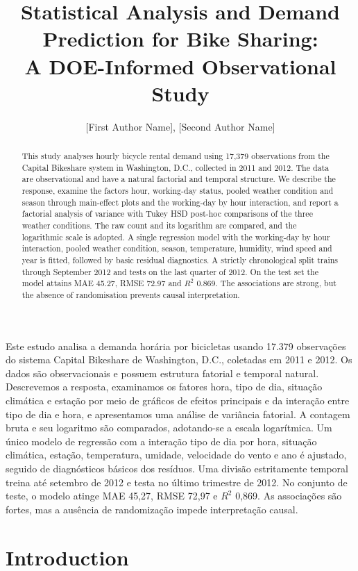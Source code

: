 \documentclass[12pt]{article}
\title{Statistical Analysis and Demand Prediction for Bike Sharing:\\
A DOE-Informed Observational Study}
\author{[First Author Name]\inst{1}, [Second Author Name]\inst{1}}
\begin{document}
\maketitle

\begin{abstract}
This study analyses hourly bicycle rental demand using 17,379 observations from
the Capital Bikeshare system in Washington, D.C., collected in 2011 and 2012.
The data are observational and have a natural factorial and temporal structure.
We describe the response, examine the factors hour, working-day status, pooled
weather condition and season through main-effect plots and the working-day by
hour interaction, and report a factorial analysis of variance with Tukey HSD
post-hoc comparisons of the three weather conditions. The raw count and its
logarithm are compared, and the logarithmic scale is adopted. A single
regression model with the working-day by hour interaction, pooled weather
condition, season, temperature, humidity, wind speed and year is fitted,
followed by basic residual diagnostics. A strictly chronological split trains through September
2012 and tests on the last quarter of 2012. On the test set the model attains
MAE 45.27, RMSE 72.97 and $R^2$ 0.869. The associations are strong, but the
absence of randomisation prevents causal interpretation.
\end{abstract}

\begin{resumo}
Este estudo analisa a demanda horária por bicicletas usando 17.379 observações
do sistema Capital Bikeshare de Washington, D.C., coletadas em 2011 e 2012. Os
dados são observacionais e possuem estrutura fatorial e temporal natural.
Descrevemos a resposta, examinamos os fatores hora, tipo de dia, situação
climática e estação por meio de gráficos de efeitos principais e da interação
entre tipo de dia e hora, e apresentamos uma análise de variância fatorial. A
contagem bruta e seu logaritmo são comparados, adotando-se a escala logarítmica.
Um único modelo de regressão com a interação tipo de dia por hora, situação
climática, estação, temperatura, umidade, velocidade do vento e ano é ajustado,
seguido de diagnósticos básicos dos resíduos. Uma divisão estritamente temporal
treina até setembro de 2012 e testa no último trimestre de 2012. No conjunto de
teste, o modelo atinge MAE 45,27, RMSE 72,97 e $R^2$ 0,869. As associações são
fortes, mas a ausência de randomização impede interpretação causal.
\end{resumo}

\section{Introduction}
\end{document}
